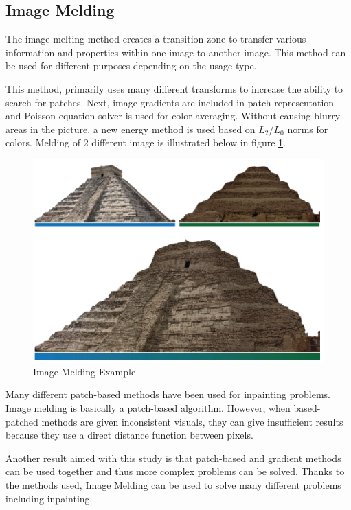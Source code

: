 \subsection{Image Melding}

The image melting method \cite{imagemelding} creates a transition zone to transfer various information and properties within one image to another image. This method can be used for different purposes depending on the usage type.

This method, primarily uses many different transforms to increase the ability to search for patches. Next, image gradients are included in patch representation and Poisson equation solver is used for color averaging. Without causing blurry areas in the picture, a new energy method is used based on \(L_2/L_0\) norms for colors. Melding of 2 different image is illustrated below in figure \ref{fig:image-melding-example}.

\begin{figure}[h]
    \centering
    \includegraphics{figures/chapter2/Image-Melding.png}
    \vspace*{5mm}
    \caption{Image Melding Example \cite{imagemelding}}
    \label{fig:image-melding-example}
\end{figure}

Many different patch-based methods have been used for inpainting problems. Image melding is basically a patch-based algorithm. However, when based-patched methods are given inconsistent visuals, they can give insufficient results because they use a direct distance function between pixels.

Another result aimed with this study is that patch-based and gradient methods can be used together and thus more complex problems can be solved. Thanks to the methods used, Image Melding can be used to solve many different problems including inpainting.

